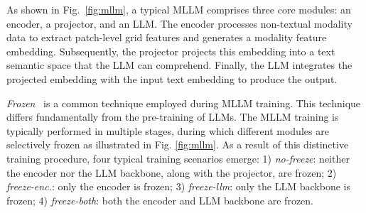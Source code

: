 \documentclass[conference]{IEEEtran}
\begin{document}
As shown in Fig.~\ref{fig:mllm}, a typical MLLM comprises three core modules\cite{li2023blip,liu2024improved,wu2024next,dong2023dreamllm}: an encoder, a projector, and an LLM.
The encoder processes non-textual modality data to extract patch-level grid features and generates a modality feature embedding.
Subsequently, the projector projects this embedding into a text semantic space that the LLM can comprehend. 
Finally, the LLM integrates the projected embedding with the input text embedding to produce the output.


\textit{Frozen}~\cite{tsimpoukelli2021multimodal} is a common technique employed during MLLM training.
This technique differs fundamentally from the pre-training of LLMs. The MLLM training is typically performed in multiple stages, during which different modules are selectively frozen as illustrated in Fig. \ref{fig:mllm}.
As a result of this distinctive training procedure, four typical training scenarios emerge:
1) \textit{no-freeze}: neither the encoder nor the LLM backbone, along with the projector, are frozen;
2) \textit{freeze-enc.}: only the encoder is frozen;
3) \textit{freeze-llm}: only the LLM backbone is frozen;
4) \textit{freeze-both}: both the encoder and LLM backbone are frozen.
\end{document}

